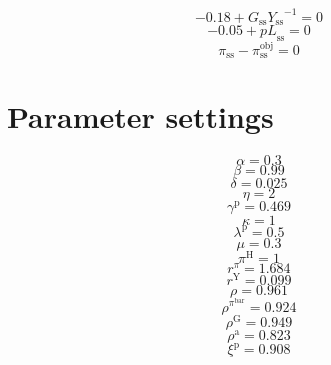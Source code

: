 \begin{equation}
-0.18 + {G_\mathrm{ss}} {Y_\mathrm{ss}}^{-1} = 0
\end{equation}
\begin{equation}
-0.05 + {p\!L}_\mathrm{ss} = 0
\end{equation}
\begin{equation}
\pi_\mathrm{ss} - \pi^{\mathrm{obj}}_\mathrm{ss} = 0
\end{equation}



\section{Parameter settings}

\begin{equation}
\alpha = 0.3
\end{equation}
\begin{equation}
\beta = 0.99
\end{equation}
\begin{equation}
\delta = 0.025
\end{equation}
\begin{equation}
\eta = 2
\end{equation}
\begin{equation}
\gamma^{\mathrm{p}} = 0.469
\end{equation}
\begin{equation}
\kappa = 1
\end{equation}
\begin{equation}
\lambda^{\mathrm{p}} = 0.5
\end{equation}
\begin{equation}
\mu = 0.3
\end{equation}
\begin{equation}
\pi^{\mathrm{H}} = 1
\end{equation}
\begin{equation}
r^{\pi} = 1.684
\end{equation}
\begin{equation}
r^{\mathrm{Y}} = 0.099
\end{equation}
\begin{equation}
\rho = 0.961
\end{equation}
\begin{equation}
\rho^{\pi^{\mathrm{bar}}} = 0.924
\end{equation}
\begin{equation}
\rho^{\mathrm{G}} = 0.949
\end{equation}
\begin{equation}
\rho^{\mathrm{a}} = 0.823
\end{equation}
\begin{equation}
\xi^{\mathrm{p}} = 0.908
\end{equation}


